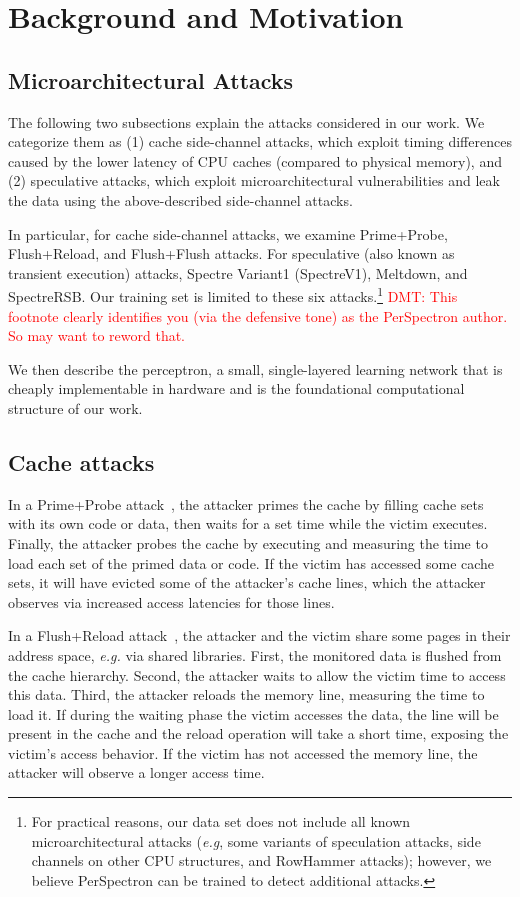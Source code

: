 \section{Background and Motivation}\label{background}
\label{motiv}
\subsection{Microarchitectural Attacks}
The following two subsections explain the attacks considered in our work. 
We categorize them as (1) cache side-channel attacks, which exploit 
timing differences caused by the lower latency of CPU caches 
(compared to physical memory), and (2) speculative attacks, 
which exploit microarchitectural vulnerabilities and leak the data 
using the above-described side-channel attacks. 

In particular, for cache side-channel attacks, we examine Prime+Probe, 
Flush+Reload, and Flush+Flush attacks. For speculative (also known as 
transient execution) attacks, Spectre Variant1 (SpectreV1), Meltdown, 
and SpectreRSB. Our training set is limited to these six attacks.\footnote{For 
practical reasons, our data set does not include all known microarchitectural 
attacks  ({\em e.g}, some variants of speculation attacks, side channels on 
other CPU structures, and RowHammer attacks); however, we believe 
PerSpectron can be trained to detect additional attacks.}
\textcolor{red}{DMT: This footnote clearly identifies you (via the defensive tone) as the 
PerSpectron author. So may want to reword that.}

We then describe the perceptron, a small, single-layered learning network
that is cheaply implementable in hardware and is the foundational computational 
structure of our work.

\subsection{Cache attacks}
In a Prime+Probe attack~\cite{PrimeProbe2015last}, the attacker primes the cache 
by filling cache sets with its own code or data, then waits for a set time while 
the victim executes. Finally, the attacker probes the cache by executing and 
measuring the time to load each set of the primed data or code. If the victim has 
accessed some cache sets, it will have evicted some of the attacker's cache 
lines, which the attacker observes via increased access latencies for those lines.

In a Flush+Reload attack~\cite{FlushReload2014Yarom}, the attacker and the 
victim share some pages in their address space, {\em e.g.} via shared libraries. 
First, the monitored data is flushed from the cache hierarchy. Second, 
the attacker waits to allow the victim time to access this data. Third, 
the attacker reloads the memory line, measuring the time to load it. If during 
the waiting phase the victim accesses the data, the line will be present in 
the cache and the reload operation will take a short time, exposing the 
victim's access behavior. If the victim has not accessed the memory 
line, the attacker will observe a longer access time. 

